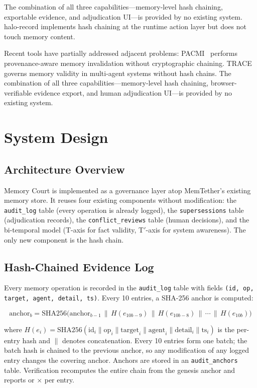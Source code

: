 \documentclass{article}
\begin{document}
The combination of all three capabilities---memory-level hash chaining, exportable evidence, and adjudication UI---is provided by no existing system. halo-record implements hash chaining at the runtime action layer but does not touch memory content.

Recent tools have partially addressed adjacent problems: PACMI~\cite{pacmi} performs provenance-aware memory invalidation without cryptographic chaining. TRACE~\cite{trace2026} governs memory validity in multi-agent systems without hash chains. The combination of all three capabilities---memory-level hash chaining, browser-verifiable evidence export, and human adjudication UI---is provided by no existing system.

\section{System Design}

\subsection{Architecture Overview}

Memory Court is implemented as a governance layer atop MemTether's existing memory store. It reuses four existing components without modification: the \texttt{audit\_log} table (every operation is already logged), the \texttt{supersessions} table (adjudication records), the \texttt{conflict\_reviews} table (human decisions), and the bi-temporal model (T-axis for fact validity, T$'$-axis for system awareness). The only new component is the hash chain.

\subsection{Hash-Chained Evidence Log}

Every memory operation is recorded in the \texttt{audit\_log} table with fields \texttt{(id, op, target, agent, detail, ts)}. Every 10 entries, a SHA-256 anchor is computed:

\begin{equation}
\text{anchor}_b = \text{SHA256}\bigl(\text{anchor}_{b-1} \,\|\, H(e_{10b-9}) \,\|\, H(e_{10b-8}) \,\|\, \cdots \,\|\, H(e_{10b})\bigr)
\end{equation}

where $H(e_i) = \text{SHA256}(\text{id}_i \| \text{op}_i \| \text{target}_i \| \text{agent}_i \| \text{detail}_i \| \text{ts}_i)$ is the per-entry hash and $\|$ denotes concatenation. Every 10 entries form one batch; the batch hash is chained to the previous anchor, so any modification of any logged entry changes the covering anchor. Anchors are stored in an \texttt{audit\_anchors} table. Verification recomputes the entire chain from the genesis anchor and reports \checkmark{} or $\times$ per entry.
\end{document}

